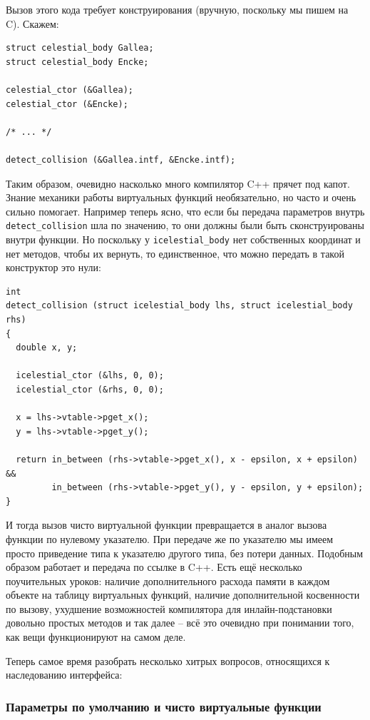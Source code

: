 \documentclass[a4paper,12pt,oneside]{article}
\begin{document}
Вызов этого кода требует конструирования (вручную, поскольку мы пишем на C). Скажем:

\begin{lstlisting}
struct celestial_body Gallea;
struct celestial_body Encke;

celestial_ctor (&Gallea);
celestial_ctor (&Encke);

/* ... */

detect_collision (&Gallea.intf, &Encke.intf);
\end{lstlisting}

Таким образом, очевидно насколько много компилятор C++ прячет под капот. Знание механики работы виртуальных функций необязательно, но часто и очень сильно помогает. Например теперь ясно, что если бы передача параметров внутрь \lstinline!detect_collision! шла по значению, то они должны были быть сконструированы внутри функции. Но поскольку у \lstinline!icelestial_body! нет собственных координат и нет методов, чтобы их вернуть, то единственное, что можно передать в такой конструктор это нули:

\begin{lstlisting}
int
detect_collision (struct icelestial_body lhs, struct icelestial_body rhs)
{
  double x, y;
  
  icelestial_ctor (&lhs, 0, 0);
  icelestial_ctor (&rhs, 0, 0);

  x = lhs->vtable->pget_x();
  y = lhs->vtable->pget_y();
 
  return in_between (rhs->vtable->pget_x(), x - epsilon, x + epsilon) && 
         in_between (rhs->vtable->pget_y(), y - epsilon, y + epsilon);
}
\end{lstlisting}

И тогда вызов чисто виртуальной функции превращается в аналог вызова функции по нулевому указателю. При передаче же по указателю мы имеем просто приведение типа к указателю другого типа, без потери данных. Подобным образом работает и передача по ссылке в C++. Есть ещё несколько поучительных уроков: наличие дополнительного расхода памяти в каждом объекте на таблицу виртуальных функций, наличие дополнительной косвенности по вызову, ухудшение возможностей компилятора для инлайн-подстановки довольно простых методов и так далее -- всё это очевидно при понимании того, как вещи функционируют на самом деле.

Теперь самое время разобрать несколько хитрых вопросов, относящихся к наследованию интерфейса:

\subsubsection{Параметры по умолчанию и чисто виртуальные функции}\label{DefArguments}
\end{document}
